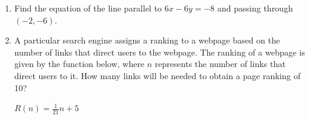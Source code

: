 \documentclass[11pt]{article}
\begin{document}
\begin{enumerate}
{{\begin{itemize}
\item
(b) \(9\)

\item
(c) \(4\)

\item
(d) \(x = -2\)

\end{itemize}
}
}

\newpage

% 

\item %
\providecommand{\stxKnowl}{}\renewcommand{\stxKnowl}[1]{#1}
\providecommand{\stxOuttro}{}\renewcommand{\stxOuttro}[1]{#1}
\providecommand{\stxTitle}{}\renewcommand{\stxTitle}[1]{#1}
\renewcommand{\stxOuttro}[1]{}
\stxKnowl{
 Find the equation of the line parallel to \(6x - 6y = -8\) and passing through \((-2, -6)\). 

\stxOuttro{
Solution

Slope:

 \(6x - 6y = -8\) 

 \(-6y = -6x + -8\) 

 \(y = 1x + \frac{4}{3}\) 

 \(m = 1\) 

Y-intercept:

 \(y = mx + b\) 

 \(-6 = 1(-2) + b\) 

 \(-6 = -2 + b\) 

 \(b = -4\) 

 \(\boxed{ y = 1x - 4 }\) 

}
}

\newpage

% 

\item %
\providecommand{\stxKnowl}{}\renewcommand{\stxKnowl}[1]{#1}
\providecommand{\stxOuttro}{}\renewcommand{\stxOuttro}[1]{#1}
\providecommand{\stxTitle}{}\renewcommand{\stxTitle}[1]{#1}
\renewcommand{\stxOuttro}[1]{}
\stxKnowl{
 A particular search engine assigns a ranking to a webpage based on the number of links that direct users to the webpage. The ranking of a webpage is given by the function below, where \(n\) represents the number of links that direct users to it. How many links will be needed to obtain a page ranking of 10? 

 \(R(n) = \frac{1}{21}n + 5\) 

}
\end{enumerate}
\end{document}
